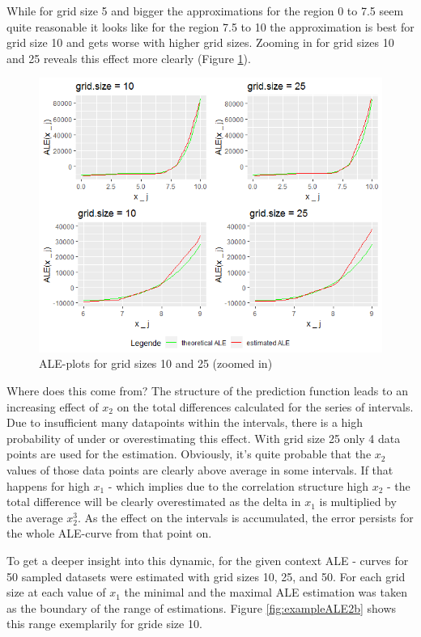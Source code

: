 \documentclass[
]{krantz}
\begin{document}
While for grid size 5 and bigger the approximations for the region 0 to 7.5 seem quite reasonable it looks like for the region 7.5 to 10 the approximation is best for grid size 10 and gets worse with higher grid sizes. Zooming in for grid sizes 10 and 25 reveals this effect more clearly (Figure \ref{fig:exampleALE2a}).

\begin{figure}
\includegraphics[width=1\linewidth]{images/ALE_2_example2_zoom_} \caption{ALE-plots for grid sizes 10 and 25 (zoomed in)}\label{fig:exampleALE2a}
\end{figure}



Where does this come from? The structure of the prediction function leads to an increasing effect of \(x_2\) on the total differences calculated for the series of intervals. Due to insufficient many datapoints within the intervals, there is a high probability of under or overestimating this effect. With grid size 25 only 4 data points are used for the estimation. Obviously, it's quite probable that the \(x_2\) values of those data points are clearly above average in some intervals. If that happens for high \(x_1\) - which implies due to the correlation structure high \(x_2\) - the total difference will be clearly overestimated as the delta in \(x_1\) is multiplied by the average \(x_2^3\). As the effect on the intervals is accumulated, the error persists for the whole ALE-curve from that point on.

To get a deeper insight into this dynamic, for the given context ALE - curves for 50 sampled datasets were estimated with grid sizes 10, 25, and 50. For each grid size at each value of \(x_1\) the minimal and the maximal ALE estimation was taken as the boundary of the range of estimations. Figure \ref{fig:exampleALE2b} shows this range exemplarily for gride size 10.
\end{document}
